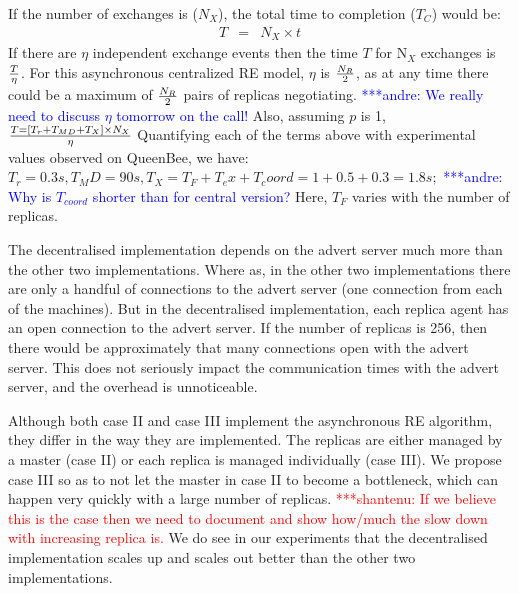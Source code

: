 \documentclass{rspublic}
\newcommand{\jhanote}[1]{ {\textcolor{red} { ***shantenu: #1 }}}
\newcommand{\alnote}[1]{ {\textcolor{blue} { ***andre: #1 }}}
\newcommand{\alnote}[1]{}
\newcommand{\jhanote}[1]{}
\begin{document}
If the number of exchanges is ($N_{X}$), the total time to completion ($T_{C}$) would be:
\begin{eqnarray}
T &=& N_{X} \times t 
\label{eq:decentr}
\end{eqnarray}
If there are $\eta$ independent exchange events then the time $T$ for 
N$_X$ exchanges is $T \over \eta$. For this asynchronous centralized RE model, $\eta$ is $N_R \over 2$, as at any time there could be a maximum of $N_R \over 2$ pairs of replicas negotiating.  \alnote{We really need to discuss $\eta$ tomorrow on the call!}
Also, assuming $p$ is 1, $T = [T_r+T_{MD} + T_{X} ] \times N_{X} \over \eta$
Quantifying each of the terms above with experimental values observed on QueenBee, we have:
$T_r = 0.3 s, T_MD=90 s, T_X=T_F+T_ex+T_coord=1+0.5+0.3=1.8 s; $ \alnote{Why is $T_{coord}$ shorter than for central version?}
Here, $T_F$ varies with the number of replicas. 





The decentralised implementation depends on the advert server much more than the other two implementations. Where as, in the other two implementations there are only a handful of connections to the advert server (one connection from each of the machines). But in the decentralised implementation, each replica agent has an open connection to the advert server. If the number of replicas is 256, then there would be approximately that many connections open with the advert server. This does not seriously impact the communication times with the advert server, and the overhead is unnoticeable.

Although both case II and case III implement the asynchronous RE
algorithm, they differ in the way they are implemented. The replicas
are either managed by a master (case II) or each replica is managed
individually (case III). We propose case III so as to not let the
master in case II to become a bottleneck, which can happen very
quickly with a large number of replicas. \jhanote{If we believe this
  is the case then we need to document and show how/much the slow down
  with increasing replica is.} We do see in our experiments that the
decentralised implementation scales up and scales out better than the
other two implementations.
\end{document}

